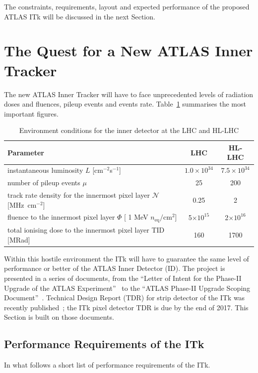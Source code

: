 The constraints, requirements, layout and expected performance of the proposed ATLAS ITk will 
be discussed in the next Section.

\section{The Quest for a New ATLAS Inner Tracker}
\label{sec:NewTracker}

The new ATLAS  Inner Tracker will have to face unprecedented levels of radiation doses and fluences, 
pileup events and events rate. Table~\ref{tab:ITkConditions} summarises the most important figures.

\begin{table}[!htpb]
\centering
\caption{\label{tab:ITkConditions}Environment conditions for the inner detector at the LHC and HL-LHC}
\begin{tabular}{lcc}
\hline
\hline
Parameter & LHC & HL-LHC \\
\hline
instantaneous luminosity $L$	 [cm$^{-2}$s$^{-1}$] & $1.0\times10^{34}$ &  $7.5\times10^{34}$ \\
number of pileup events $\mu$ & 25 & 200\\
track rate density for the innermost pixel layer $\mathcal{N}$ [MHz~cm$^{-2}$] & 0.25 & 2 \\ 
fluence to the innermost pixel layer $\Phi$ [ 1 MeV $n_\text{eq}/\text{cm}^2$] & 5$\times10^{15}$ & 2$\times10^{16}$ \\
total ionising dose to the innermost pixel layer TID [MRad] & 160  & 1700 \\
\hline
\end{tabular}
\end{table}

Within this hostile environment the ITk will have to guarantee the same level of performance  or better 
of the ATLAS Inner Detector (ID).
The project is presented  in a series of documents, from the ``Letter of Intent for the Phase-II Upgrade of the ATLAS Experiment''~\cite{ATLASLoIPhaseII} to the ``ATLAS Phase-II Upgrade Scoping Document''~\cite{ATLASITkScopingDocument}. Technical Design Report (TDR) for strip detector of the 
ITk was recently published~\cite{ITkStripsTDR}; the ITk pixel detector TDR is due by the end of 2017.
This Section is built on those documents.




\subsection{Performance Requirements of the ITk}
In what follows a short list of performance requirements of the ITk.

